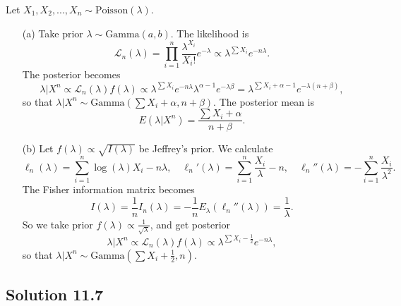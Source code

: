 Let $X_1, X_2, ..., X_n \sim \mathrm{Poisson}(\lambda)$.
\begin{itemize}
    \item[(a)] Take prior $\lambda \sim \mathrm{Gamma}(a, b)$.
        The likelihood is
        \begin{equation*}
            \mathcal{L}_n(\lambda) = \prod_{i = 1}^n \frac{\lambda^{X_i}}{X_i!} e^{-\lambda}
                \propto \lambda^{\sum X_i} e^{-n\lambda}.
        \end{equation*}
        The posterior becomes
        \begin{equation*}
            \lambda|X^n \propto \mathcal{L}_n(\lambda) f(\lambda)
                \propto \lambda^{\sum X_i} e^{-n\lambda} \lambda^{\alpha - 1} e^{-\lambda \beta}
                = \lambda^{\sum X_i + \alpha - 1} e^{-\lambda (n + \beta)},
        \end{equation*}
        so that $\lambda|X^n \sim \mathrm{Gamma}(\sum X_i + \alpha, n + \beta)$.
        The posterior mean is
        \begin{equation*}
            E(\lambda|X^n) = \frac{\sum X_i + \alpha}{n + \beta}.
        \end{equation*}
    \item[(b)] Let $f(\lambda) \propto \sqrt{I(\lambda)}$ be Jeffrey's prior.
        We calculate
        \begin{equation*}
            \ell_n(\lambda) = \sum_{i = 1}^n \log(\lambda) X_i - n \lambda, \quad
            \ell_n'(\lambda) = \sum_{i = 1}^n \frac{X_i}{\lambda} - n, \quad
            \ell_n''(\lambda) = -\sum_{i = 1}^n \frac{X_i}{\lambda^2}.
        \end{equation*}
        The Fisher information matrix becomes
        \begin{equation*}
            I(\lambda) = \frac{1}{n} I_n(\lambda)
                = -\frac{1}{n} E_{\lambda}(\ell_n''(\lambda))
                = \frac{1}{\lambda}.
        \end{equation*}
        So we take prior $f(\lambda) \propto \frac{1}{\sqrt{\lambda}}$, and get posterior
        \begin{equation*}
            \lambda|X^n \propto \mathcal{L}_n(\lambda) f(\lambda)
                \propto \lambda^{\sum X_i - \frac{1}{2}} e^{-n\lambda},
        \end{equation*}
        so that $\lambda|X^n \sim \mathrm{Gamma}\left(\sum X_i + \frac{1}{2}, n\right)$.
\end{itemize}


\subsection*{Solution 11.7}

